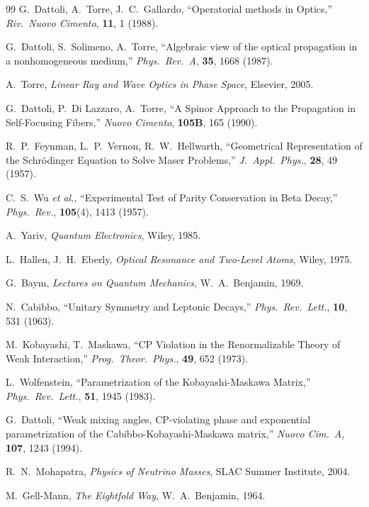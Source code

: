 \begin{thebibliography}{99}
G.~Dattoli, A.~Torre, J.~C.~Gallardo,
``Operatorial methods in Optics,''
\emph{Riv.\ Nuovo Cimento}, \textbf{11}, 1 (1988).

G.~Dattoli, S.~Solimeno, A.~Torre,
``Algebraic view of the optical propagation in a nonhomogeneous medium,''
\emph{Phys.\ Rev.\ A}, \textbf{35}, 1668 (1987).

A.~Torre, \emph{Linear Ray and Wave Optics in Phase Space}, Elsevier, 2005.

G.~Dattoli, P.~Di Lazzaro, A.~Torre,
``A Spinor Approach to the Propagation in Self-Focusing Fibers,''
\emph{Nuovo Cimento}, \textbf{105B}, 165 (1990).

R.~P.~Feynman, L.~P.~Vernon, R.~W.~Hellwarth,
``Geometrical Representation of the Schr\"odinger Equation to Solve Maser Problems,''
\emph{J.\ Appl.\ Phys.}, \textbf{28}, 49 (1957).

C.~S.~Wu \emph{et al.},
``Experimental Test of Parity Conservation in Beta Decay,''
\emph{Phys.\ Rev.}, \textbf{105}(4), 1413 (1957).

A.~Yariv, \emph{Quantum Electronics}, Wiley, 1985.

L.~Hallen, J.~H.~Eberly, \emph{Optical Resonance and Two-Level Atoms}, Wiley, 1975.

G.~Baym, \emph{Lectures on Quantum Mechanics}, W.~A.~Benjamin, 1969.

N.~Cabibbo,
``Unitary Symmetry and Leptonic Decays,''
\emph{Phys.\ Rev.\ Lett.}, \textbf{10}, 531 (1963).

M.~Kobayashi, T.~Maskawa,
``CP Violation in the Renormalizable Theory of Weak Interaction,''
\emph{Prog.\ Theor.\ Phys.}, \textbf{49}, 652 (1973).

L.~Wolfenstein,
``Parametrization of the Kobayashi-Maskawa Matrix,''
\emph{Phys.\ Rev.\ Lett.}, \textbf{51}, 1945 (1983).

G.~Dattoli,
``Weak mixing angles, CP-violating phase and exponential parametrization of the Cabibbo-Kobayashi-Maskawa matrix,''
\emph{Nuovo Cim.\ A}, \textbf{107}, 1243 (1994).

R.~N.~Mohapatra, \emph{Physics of Neutrino Masses}, SLAC Summer Institute, 2004.

M.~Gell-Mann, \emph{The Eightfold Way}, W.~A.~Benjamin, 1964.


\end{thebibliography}
